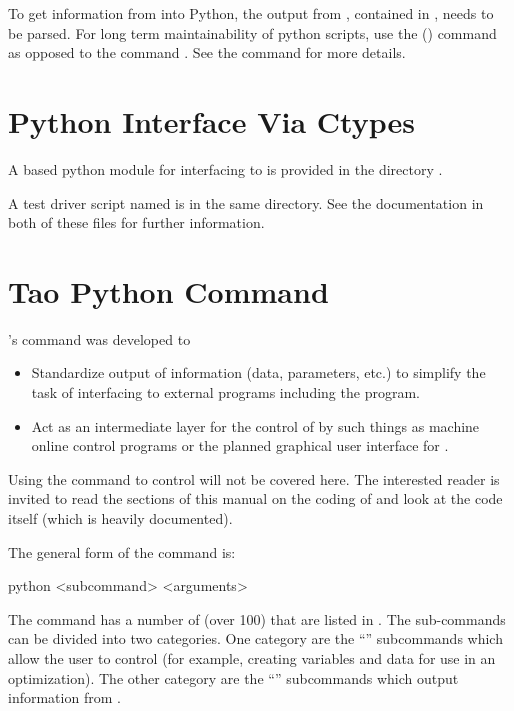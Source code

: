 To get information from \tao into Python, the output from \tao,
contained in , needs to be parsed. For long term
maintainability of python scripts, use the  () command 
as opposed to the  command . See the  command for more details.

\section{Python Interface Via Ctypes}

A  based python module  for interfacing \tao to  is provided in
the directory .

A test driver script named  is in the same directory. See the documentation in
both of these files for further information.

\section{Tao Python Command}
\label{s:python.python}
\tao's  command was developed to
%
\begin{itemize}
\item 
Standardize output of information (data, parameters, etc.) to simplify the task of interfacing \tao
to external programs including the  program.
% 
\item 
Act as an intermediate layer for the control of \tao by such things as machine online control
programs or the planned graphical user interface for \tao.
\end{itemize}
Using the  command to control \tao will not be covered here. The interested reader is
invited to read the sections of this manual on the coding of \tao and look at the \tao code itself
(which is heavily documented).

The general form of the  command is:
\begin{example}
  python <subcommand> <arguments>
\end{example}
The  command has a number of  (over 100) that are listed in
. The sub-commands can be divided into two categories. One category are the
``'' subcommands which allow the user to control \tao (for example, creating variables
and data for use in an optimization). The other category are the ``'' subcommands which
output information from \tao.

